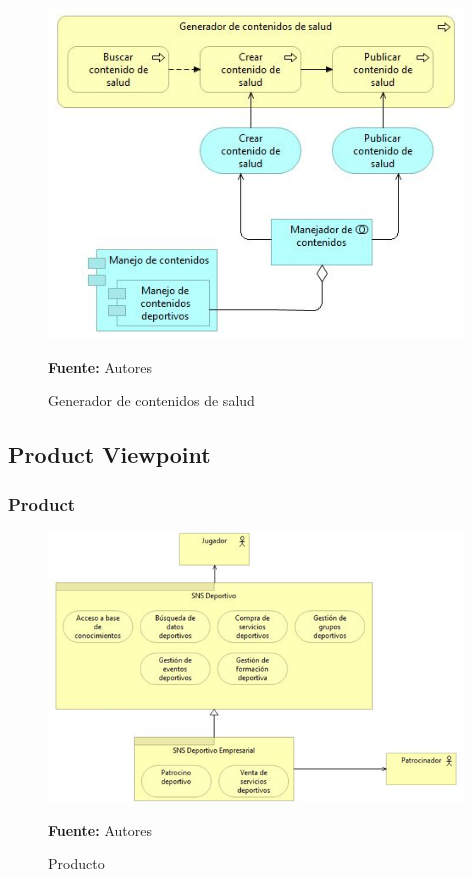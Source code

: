 \begin{figure}[!htb]
  \begin{center}
    \includegraphics[width=11cm]{./imagenes/Archimate/vistas/application_usage/generadorcontenidossalud.png}
    \caption{Generador de contenidos de salud}
    \label{fig:BP_GeneradorContenidosSalud}
    \textbf{Fuente:}  Autores
  \end{center}
\end{figure}

\subsection{Product Viewpoint}

\subsubsection{Product}

\begin{figure}[!htb]
  \begin{center}
    \includegraphics[width=11cm]{./imagenes/Archimate/vistas/generales/Product.png}
    \caption{Producto}
    \label{fig:Product}
    \textbf{Fuente:}  Autores
  \end{center}
\end{figure}

